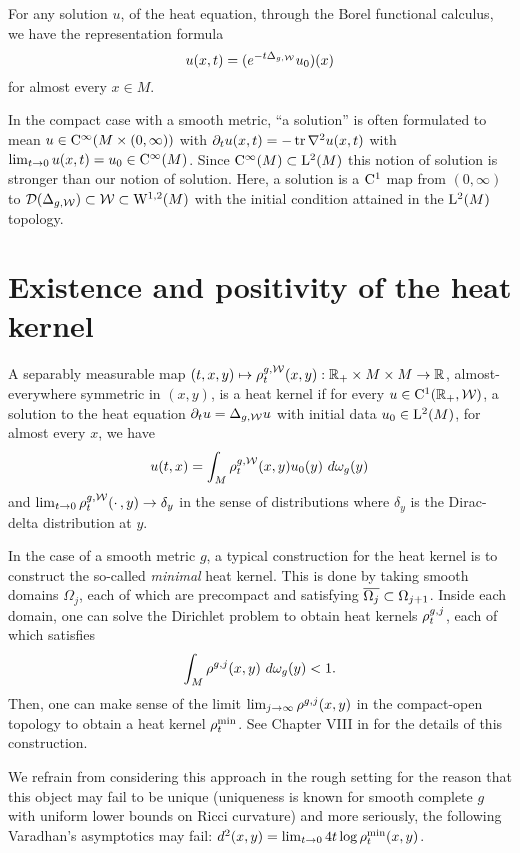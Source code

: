 \documentclass[a4paper, 12pt]{amsart}
\begin{document}
For any solution \(u\), of the heat equation, through the Borel functional calculus, we have the representation formula
\[
u(x,t) = (e^{-t \Delta_{g,\mathcal{W}}}u_0)(x)
\]
for almost every $x \in M$.
 
\begin{rem}
In the compact case with a smooth metric, ``a solution'' is often formulated to mean $u \in {\rm C}^{\infty}_{\rm {}}( M \times (0, \infty))$
with $\partial_t u(x,t) = -\operatorname{tr} \nabla^2 u(x,t)$ with 
$\lim_{t \to 0} u(x,t) = u_0 \in {\rm C}^{\infty}_{\rm {}}(M)$.
Since ${\rm C}^{\infty}_{\rm {}}(M) \subset {\rm L}^{2}_{\rm {}}(M)$ this notion of solution is stronger than our notion of solution. Here, a solution is a ${\rm C}^{1}_{\rm {}}$ map from $(0, \infty)$ to ${\mathcal{D}}(\Delta_{g,\mathcal{W}}) \subset \mathcal{W} \subset {{\rm W}^{1,2}_{\rm {}}}(M)$ with the initial condition attained in the ${\rm L}^{2}_{\rm {}}(M)$ topology.
\end{rem}

\section{Existence and positivity of the heat kernel}

\begin{defn}
A separably measurable map $(t,x,y) \mapsto \rho^{g,\mathcal{W}}_{t}(x,y): \mathbb{R}_+ \times M \times M \to \mathbb{R}$, 
almost-everywhere symmetric in $(x,y)$, is a heat kernel 
if for every $u \in {\rm C}^{1}_{\rm {}}(\mathbb{R}_+, \mathcal{W})$, a solution to the heat equation 
$\partial_t u = \Delta_{g,\mathcal{W}}u$ with initial data $u_0 \in {\rm L}^{2}_{\rm {}}(M)$, for almost every $x$, we have
\[
u(t,x) = \int_{M} \rho^{g,\mathcal{W}}_t(x,y) u_0(y)\ d\omega_g(y)
\]
and
$\lim_{t \to 0} \rho_t^{g,\mathcal{W}}(\cdotp,y) \to \delta_y$ in the sense of distributions where $\delta_y$ is the Dirac-delta distribution at $y$.
\end{defn}

In the case of a smooth metric $g$, a typical construction for
the heat kernel is to construct the so-called \emph{minimal} heat kernel.
This is done by taking smooth domains $\Omega_j$, 
each of which are precompact and satisfying $\overline{\Omega_j} \subset \Omega_{j+1}$. 
Inside each domain, one can solve the Dirichlet problem
to obtain heat kernels $\rho^{g,j}_{t}$, each of which
satisfies 
$$ \int_{M} \hk^{g,j}(x,y)\ d\omega_g(y) < 1.$$
Then, one can make sense of the limit $\lim_{j \to \infty} \rho^{g,j}(x,y)$
in the compact-open topology to obtain a heat kernel $\rho^{\min}_t$.
See Chapter VIII in \cite{Chavel} for the details
of this construction.

We refrain from considering this approach in the rough setting 
for the reason that this object may fail to be unique (uniqueness
is known for smooth complete $g$ with 
uniform lower bounds on Ricci curvature) and more seriously, the following
Varadhan's asymptotics may fail: 
$d^2(x,y) = \lim_{t \to 0} 4t \log \rho^{\min}_t(x,y)$.
\end{document}
